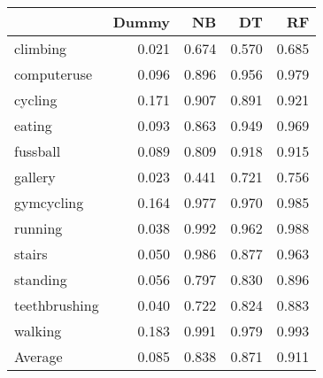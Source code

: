 \begin{tabular}{lrrrr}
\toprule
{} &  Dummy &    NB &    DT &    RF \\
\midrule
climbing      &  0.021 & 0.674 & 0.570 & 0.685 \\
computeruse   &  0.096 & 0.896 & 0.956 & 0.979 \\
cycling       &  0.171 & 0.907 & 0.891 & 0.921 \\
eating        &  0.093 & 0.863 & 0.949 & 0.969 \\
fussball      &  0.089 & 0.809 & 0.918 & 0.915 \\
gallery       &  0.023 & 0.441 & 0.721 & 0.756 \\
gymcycling    &  0.164 & 0.977 & 0.970 & 0.985 \\
running       &  0.038 & 0.992 & 0.962 & 0.988 \\
stairs        &  0.050 & 0.986 & 0.877 & 0.963 \\
standing      &  0.056 & 0.797 & 0.830 & 0.896 \\
teethbrushing &  0.040 & 0.722 & 0.824 & 0.883 \\
walking       &  0.183 & 0.991 & 0.979 & 0.993 \\
Average       &  0.085 & 0.838 & 0.871 & 0.911 \\
\bottomrule
\end{tabular}
